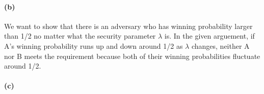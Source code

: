 \documentclass{article}
\begin{document}
\paragraph{(b)}
We want to show that there is an adversary who has winning probability larger than 1/2 no matter what the security parameter $\lambda$ is. In the given arguement, if A's winning probability runs up and down around 1/2 as $\lambda$ changes, neither A nor B meets the requirement because both of their winning probabilities fluctuate around 1/2.
\paragraph{(c)}
\end{document}
